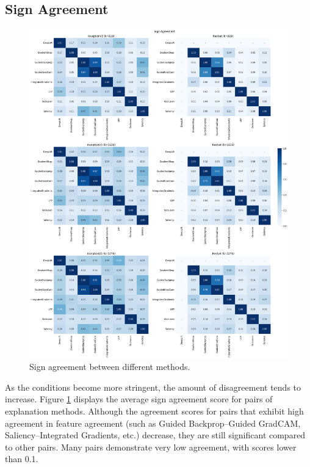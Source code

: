 \subsection{Sign Agreement}
\label{subsec:signAgreement}
\begin{figure}[t]
    \centering
    \includegraphics[width=\textwidth]{images/results/sign-agreement.png}
    \caption{Sign agreement between different methods.}
    \label{fig:signAgreement}
\end{figure}

As the conditions become more stringent, the amount of disagreement tends to increase. Figure \ref{fig:signAgreement} displays the average sign agreement score for pairs of explanation methods. Although the agreement scores for pairs that exhibit high agreement in feature agreement (such as Guided Backprop--Guided GradCAM, Saliency--Integrated Gradients, etc.) decrease, they are still significant compared to other pairs. Many pairs demonstrate very low agreement, with scores lower than 0.1.

